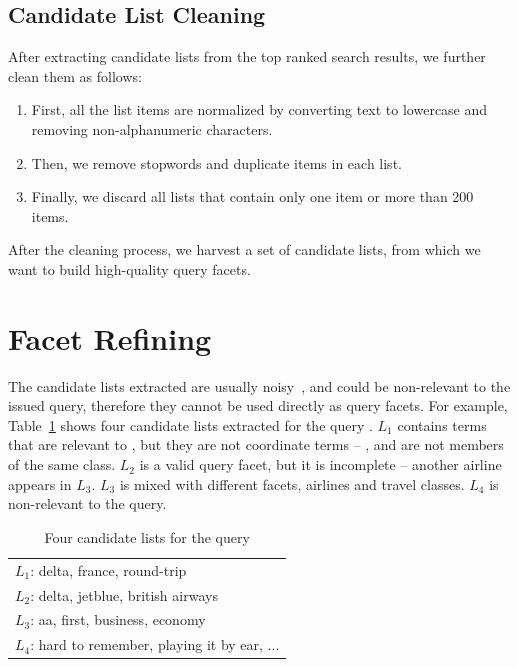 \subsection{Candidate List Cleaning}
After extracting candidate lists from the top ranked search results, we further clean them as follows:
\begin{enumerate}[label={(\arabic*)}]
 \item First, all the list items are normalized by converting text to lowercase and removing non-alphanumeric characters.
 \item Then, we remove stopwords and duplicate items in each list.
 \item Finally, we discard all lists that contain only one item or more than 200 items. 
\end{enumerate}

After the cleaning process, we harvest a set of candidate lists, from which we want to build high-quality query facets. 

\section{Facet Refining}
\label{sec:facet-refine}
The candidate lists extracted are usually noisy~\cite{zhang2009employing},
and could be non-relevant to the issued query, therefore they cannot be used directly as query facets. For example, Table~\ref{tab:facet-candidates} shows four candidate lists extracted for the query . $L_1$ contains terms that are relevant to , but they are not coordinate terms -- ,  and  are not members of the same class. 
$L_2$ is a valid query facet, but it is incomplete -- another airline  appears in $L_3$. $L_3$ is mixed with different facets, airlines and travel classes. $L_4$ is non-relevant to the query. 
\begin{table}[ht!]
\centering
\caption{Four candidate lists for the query }
\label{tab:facet-candidates}
\begin{tabular}{|l|} \hline
$L_1$: delta, france, round-trip\\
$L_2$: delta, jetblue, british airways\\ 
$L_3$: aa, first, business, economy\\
$L_4$: hard to remember, playing it by ear, ...\\
\hline
\end{tabular}
\end{table}

